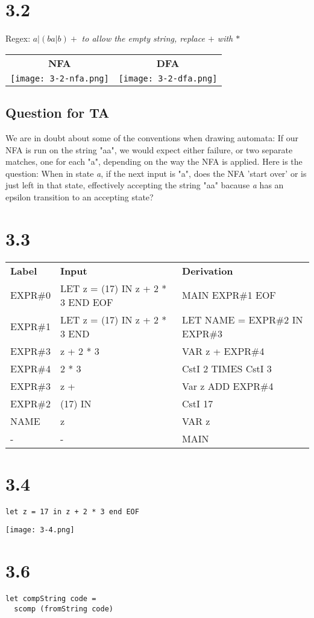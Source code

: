 \documentclass{article}
\begin{document}
\section*{3.2}

Regex: $a|(ba|b)+$
\newline\textit{to allow the empty string, replace $+$ with $*$}

\vspace{10 mm}

\begin{tabular}{c c}
\textbf{NFA} & \textbf{DFA} \\
\texttt{[image: 3-2-nfa.png]} &
	\texttt{[image: 3-2-dfa.png]}
\end{tabular}
\subsection*{Question for TA}
We are in doubt about some of the conventions when drawing automata:
If our NFA is run on the string "aa", we would expect either failure, or
two separate matches, one for each "a", depending on the way the NFA is applied.
Here is the question: When in state \emph{a}, if the next input is "a", does the
NFA 'start over' or is just left in that state, effectively accepting the string
"aa" bacause \emph{a} has an epsilon transition to an accepting state?

\section*{3.3}

\begin{tabular}{l l l}
\textbf{Label} & \textbf{Input} & \textbf{Derivation} \\
EXPR\#0 & LET z = (17) IN z + 2 * 3 END EOF & MAIN EXPR\#1 EOF \\
EXPR\#1 & LET z = (17) IN z + 2 * 3 END & LET NAME = EXPR\#2 IN EXPR\#3 \\
EXPR\#3 & z + 2 * 3 & VAR z + EXPR\#4 \\
EXPR\#4 & 2 * 3 & CstI 2 TIMES CstI 3 \\
EXPR\#3 & z + & Var z ADD EXPR\#4 \\
EXPR\#2 & (17) IN & CstI 17 \\
NAME    & z & VAR z \\
-       & - & MAIN

\end{tabular}

\section*{3.4}
\begin{verbatim}
let z = 17 in z + 2 * 3 end EOF
\end{verbatim}
\texttt{[image: 3-4.png]}

\section*{3.6}

\begin{verbatim}
let compString code =
  scomp (fromString code)
\end{verbatim}
\end{document}
